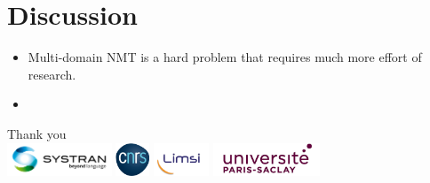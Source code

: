 \documentclass{beamer}
\begin{document}
\section{Discussion} %

\begin{frame}
\begin{itemize}
	\item Multi-domain NMT is a hard problem that requires much more effort of research.
	\item 
	
\end{itemize}
\end{frame}

\begin{frame}

\centering
\Huge
Thank you \\
\vspace{1.5cm}
    \includegraphics[height=1.0cm]{systran-logo.png}
    \includegraphics[height=1.0cm]{cnrs-logo.png}
    \includegraphics[height=1.0cm]{limsi-logo.png}
    \includegraphics[height=1.0cm]{ups-logo.png}
\end{frame}


\end{document}
